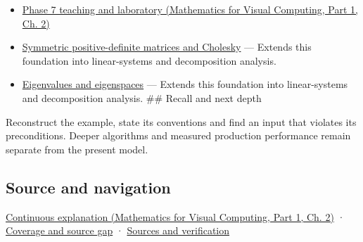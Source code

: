 \hypertarget{appendix-175ca5ff874d-used-by}{}

\begin{itemize}
\tightlist
\item
  \href{../02-Mathematics-for-Visual-Computing-P01/main.pdf\#nameddest=01-foundations-i-ch018-keep-the-promises-visible-while-moving-between-representations}{Phase 7 teaching and laboratory (Mathematics for Visual Computing, Part 1, Ch. 2)}
\item
  \hyperref[appendix-50d2ea3c9b26]{Symmetric positive-definite matrices and Cholesky} --- Extends this foundation into linear-systems and decomposition analysis.
\item
  \hyperref[appendix-0b3be18411f9]{Eigenvalues and eigenspaces} --- Extends this foundation into linear-systems and decomposition analysis. \#\# Recall and next depth
\end{itemize}

Reconstruct the example, state its conventions and find an input that violates its preconditions. Deeper algorithms and measured production performance remain separate from the present model.

\subsection{Source and navigation}\label{appendix-175ca5ff874d-source-and-navigation}

\hypertarget{appendix-175ca5ff874d-source-and-navigation}{}

\href{../02-Mathematics-for-Visual-Computing-P01/main.pdf\#nameddest=01-foundations-i-ch018-keep-the-promises-visible-while-moving-between-representations}{Continuous explanation (Mathematics for Visual Computing, Part 1, Ch. 2)} · \hyperref[appendix-fd090d982a15-phase-7---parts-601-700]{Coverage and source gap} · \hyperref[appendix-a103e7846d21-phase-7---source-analysis-and-verification]{Sources and verification}
